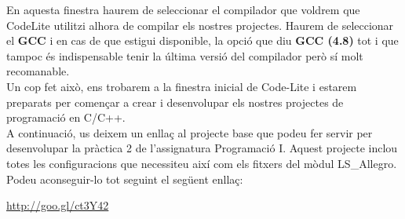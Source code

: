 \documentclass[11pt]{article}
\begin{document}
\noindent En aquesta finestra haurem de seleccionar el compilador que voldrem que CodeLite utilitzi alhora de compilar els nostres projectes. Haurem de seleccionar el \textbf{GCC} i en cas de que estigui disponible, la opció que diu \textbf{GCC (4.8)} tot i que tampoc és indispensable tenir la última versió del compilador però sí molt recomanable. \\

\noindent Un cop fet això, ens trobarem a la finestra inicial de Code-Lite i estarem preparats per començar a crear i desenvolupar els nostres projectes de programació en C/C++.\\

\noindent A continuació, us deixem un enllaç al projecte base que podeu fer servir per desenvolupar la pràctica 2 de l'assignatura Programació I. Aquest projecte inclou totes les configuracions que necessiteu així com els fitxers del mòdul LS\_Allegro. Podeu aconseguir-lo tot seguint el següent enllaç:
\begin{center}
	\url{http://goo.gl/ct3Y42}
\end{center}
\end{document}
